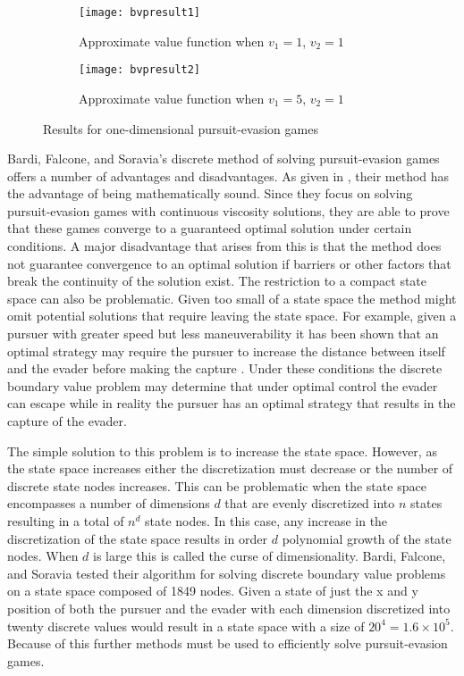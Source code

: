 \begin{figure}[h!]
\centering
\begin{subfigure}[t]{0.475\textwidth}
	\centering
	\texttt{[image: bvpresult1]}
	\caption{Approximate value function when $v_1 = 1$, $v_2 = 1$}
	\label{bvpresult1}
\end{subfigure}
\hfill
\begin{subfigure}[t]{0.475\textwidth}
	\centering
	\texttt{[image: bvpresult2]}
	\caption{Approximate value function when $v_1 = 5$, $v_2 = 1$}
	\label{bvpresult2}
\end{subfigure}
\caption{Results for one-dimensional pursuit-evasion games \cite{bardi2}}
\label{bvpresults}
\end{figure}
   
Bardi, Falcone, and Soravia's discrete method of solving pursuit-evasion games offers a number of advantages and disadvantages. As given in , their method has the advantage of being mathematically sound. Since they focus on solving pursuit-evasion games with continuous viscosity solutions, they are able to prove that these games converge to a guaranteed optimal solution under certain conditions. A major disadvantage that arises from this is that the method does not guarantee convergence to an optimal solution if barriers or other factors that break the continuity of the solution exist. The restriction to a compact state space can also be problematic. Given too small of a state space the method might omit potential solutions that require leaving the state space. For example, given a pursuer with greater speed but less maneuverability it has been shown that an optimal strategy may require the pursuer to increase the distance between itself and the evader before making the capture \cite{isaacs}. Under these conditions the discrete boundary value problem may determine that under optimal control the evader can escape while in reality the pursuer has an optimal strategy that results in the capture of the evader.

The simple solution to this problem is to increase the state space. However, as the state space increases either the discretization must decrease or the number of discrete state nodes increases. This can be problematic when the state space encompasses a number of dimensions $d$ that are evenly discretized into $n$ states resulting in a total of $n^d$ state nodes. In this case, any increase in the discretization of the state space results in order $d$ polynomial growth of the state nodes. When $d$ is large this is called the curse of dimensionality. Bardi, Falcone, and Soravia tested their algorithm for solving discrete boundary value problems on a state space composed of 1849 nodes. Given a state of just the x and y position of both the pursuer and the evader with each dimension discretized into twenty discrete values would result in a state space with a size of $20^4 = 1.6 \times 10^5$. Because of this further methods must be used to efficiently solve pursuit-evasion games. 

